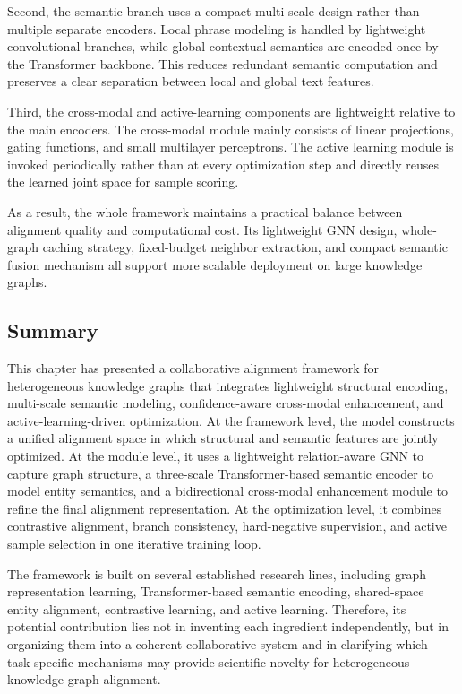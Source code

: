 Second, the semantic branch uses a compact multi-scale design rather than multiple separate encoders. Local phrase modeling is handled by lightweight convolutional branches, while global contextual semantics are encoded once by the Transformer backbone. This reduces redundant semantic computation and preserves a clear separation between local and global text features.

Third, the cross-modal and active-learning components are lightweight relative to the main encoders. The cross-modal module mainly consists of linear projections, gating functions, and small multilayer perceptrons. The active learning module is invoked periodically rather than at every optimization step and directly reuses the learned joint space for sample scoring.

As a result, the whole framework maintains a practical balance between alignment quality and computational cost. Its lightweight GNN design, whole-graph caching strategy, fixed-budget neighbor extraction, and compact semantic fusion mechanism all support more scalable deployment on large knowledge graphs.

\subsection{Summary}

This chapter has presented a collaborative alignment framework for heterogeneous knowledge graphs that integrates lightweight structural encoding, multi-scale semantic modeling, confidence-aware cross-modal enhancement, and active-learning-driven optimization. At the framework level, the model constructs a unified alignment space in which structural and semantic features are jointly optimized. At the module level, it uses a lightweight relation-aware GNN to capture graph structure, a three-scale Transformer-based semantic encoder to model entity semantics, and a bidirectional cross-modal enhancement module to refine the final alignment representation. At the optimization level, it combines contrastive alignment, branch consistency, hard-negative supervision, and active sample selection in one iterative training loop.

The framework is built on several established research lines, including graph representation learning, Transformer-based semantic encoding, shared-space entity alignment, contrastive learning, and active learning. Therefore, its potential contribution lies not in inventing each ingredient independently, but in organizing them into a coherent collaborative system and in clarifying which task-specific mechanisms may provide scientific novelty for heterogeneous knowledge graph alignment.
